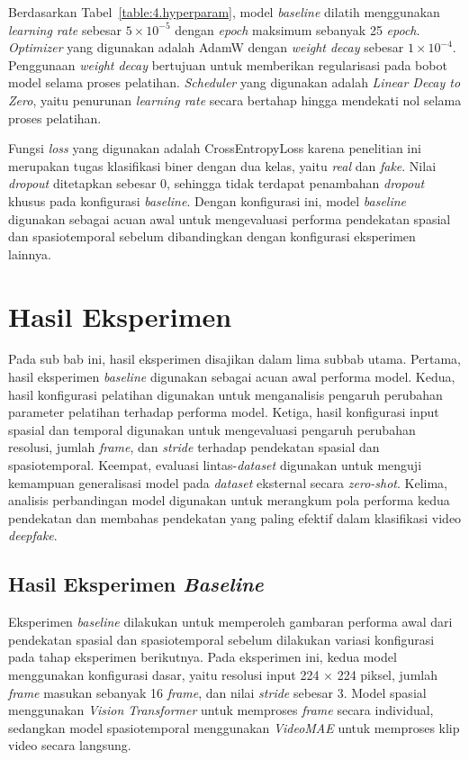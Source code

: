 Berdasarkan Tabel~\ref{table:4.hyperparam}, model \textit{baseline} dilatih menggunakan \textit{learning rate} sebesar $5\times10^{-5}$ dengan \textit{epoch} maksimum sebanyak 25 \textit{epoch}. \textit{Optimizer} yang digunakan adalah AdamW dengan \textit{weight decay} sebesar $1\times10^{-4}$. Penggunaan \textit{weight decay} bertujuan untuk memberikan regularisasi pada bobot model selama proses pelatihan. \textit{Scheduler} yang digunakan adalah \textit{Linear Decay to Zero}, yaitu penurunan \textit{learning rate} secara bertahap hingga mendekati nol selama proses pelatihan.

Fungsi \textit{loss} yang digunakan adalah CrossEntropyLoss karena penelitian ini merupakan tugas klasifikasi biner dengan dua kelas, yaitu \textit{real} dan \textit{fake}. Nilai \textit{dropout} ditetapkan sebesar 0, sehingga tidak terdapat penambahan \textit{dropout} khusus pada konfigurasi \textit{baseline}. Dengan konfigurasi ini, model \textit{baseline} digunakan sebagai acuan awal untuk mengevaluasi performa pendekatan spasial dan spasiotemporal sebelum dibandingkan dengan konfigurasi eksperimen lainnya.

\section{Hasil Eksperimen} \label{IV.Eksperimen}
Pada sub bab ini, hasil eksperimen disajikan dalam lima subbab utama. Pertama, hasil eksperimen \textit{baseline} digunakan sebagai acuan awal performa model. Kedua, hasil konfigurasi pelatihan digunakan untuk menganalisis pengaruh perubahan parameter pelatihan terhadap performa model. Ketiga, hasil konfigurasi input spasial dan temporal digunakan untuk mengevaluasi pengaruh perubahan resolusi, jumlah \textit{frame}, dan \textit{stride} terhadap pendekatan spasial dan spasiotemporal. Keempat, evaluasi lintas-\textit{dataset} digunakan untuk menguji kemampuan generalisasi model pada \textit{dataset} eksternal secara \textit{zero-shot}. Kelima, analisis perbandingan model digunakan untuk merangkum pola performa kedua pendekatan dan membahas pendekatan yang paling efektif dalam klasifikasi video \textit{deepfake}.

\subsection{Hasil Eksperimen \textit{Baseline}} \label{IV.Eksperimen_Baseline}
Eksperimen \textit{baseline} dilakukan untuk memperoleh gambaran performa awal dari pendekatan spasial dan spasiotemporal sebelum dilakukan variasi konfigurasi pada tahap eksperimen berikutnya. Pada eksperimen ini, kedua model menggunakan konfigurasi dasar, yaitu resolusi input 224 $\times$ 224 piksel, jumlah \textit{frame} masukan sebanyak 16 \textit{frame}, dan nilai \textit{stride} sebesar 3. Model spasial menggunakan \textit{Vision Transformer} untuk memproses \textit{frame} secara individual, sedangkan model spasiotemporal menggunakan \textit{VideoMAE} untuk memproses klip video secara langsung.

